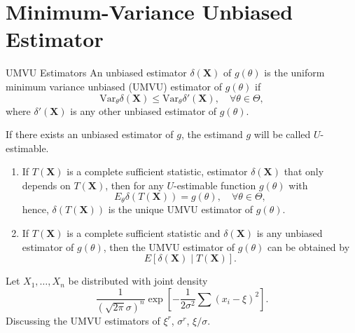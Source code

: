 \chapter{Minimum-Variance Unbiased Estimator}

\begin{definition}{UMVU Estimators}{}
    An unbiased estimator $\delta(\textbf{X})$ of $g(\theta)$ is the uniform minimum variance unbiased (UMVU) estimator of $g(\theta)$ if
    \begin{equation}
        \text{Var}_{\theta}\delta(\textbf{X})\leq\text{Var}_{\theta}\delta'(\textbf{X}),\quad\forall\theta\in\Theta,
    \end{equation}
    where $\delta'(\textbf{X})$ is any other unbiased estimator of $g(\theta)$.
\end{definition}

\begin{note}
    If there exists an unbiased estimator of $g$, the estimand $g$ will be called $U$-estimable.
\end{note}

\begin{enumerate}
    \item If $T(\textbf{X})$ is a complete sufficient statistic, estimator $\delta(\textbf{X})$ that only depends on $T(\textbf{X})$, then for any $U$-estimable function $g(\theta)$ with
    \begin{equation}
        E_{\theta}\delta(T(\textbf{X}))=g(\theta),\quad\forall\theta\in\Theta,
    \end{equation}
    hence, $\delta(T(\textbf{X}))$ is the unique UMVU estimator of $g(\theta)$.
    \item If $T(\textbf{X})$ is a complete sufficient statistic and $\delta({\textbf{X}})$ is any unbiased estimator of $g(\theta)$, then the UMVU estimator of $g(\theta)$ can be obtained by
    \begin{equation}
        E\left[\delta(\textbf{X})\mid T(\textbf{X})\right].
    \end{equation}
\end{enumerate}

\begin{example}
    Let $X_{1},\ldots,X_{n}$ be distributed with joint density
    \begin{equation}
        \frac{1}{(\sqrt{2\pi}\sigma)^{n}}\exp\left[-\frac{1}{2\sigma^{2}}\sum\left(x_{i}-\xi\right)^{2}\right].
    \end{equation}
    Discussing the UMVU estimators of $\xi^r$, $\sigma^r$, $\xi/\sigma$.
\end{example}

